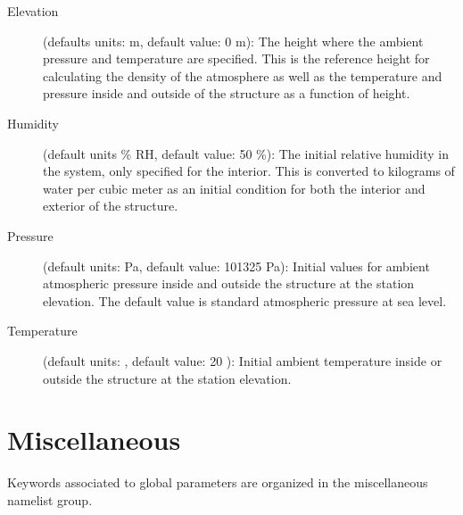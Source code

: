 \begin{description}
\item[Elevation] (defaults units: m, default value: 0 m): The height where the ambient pressure and temperature are specified.  This is the reference height for calculating the density of the atmosphere as well as the temperature and pressure inside and outside of the structure as a function of height.

\item[Humidity] (default units \% RH, default value: 50 \%): The initial relative humidity in the system, only specified for the interior.  This is converted to kilograms of water per cubic meter as an initial condition for both the interior and exterior of the structure.

\item[Pressure] (default units: Pa, default value: 101325 Pa): Initial values for ambient atmospheric pressure inside and outside the structure at the station elevation. The default value is standard atmospheric pressure at sea level.

\item[Temperature] (default units: \degc, default value: 20 \degc): Initial ambient temperature inside or outside the structure at the station elevation.
\end{description}




\section{Miscellaneous}
\label{info:MISC}

Keywords associated to global parameters are organized in the miscellaneous namelist group.

